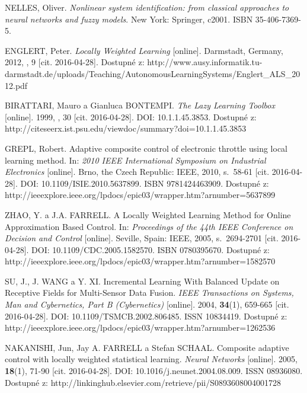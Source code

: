 \begin{thebibliography}{14}
	
	NELLES, Oliver. \textit{Nonlinear system identification: from classical approaches to neural networks and fuzzy models}. New York: Springer, c2001. ISBN 35-406-7369-5.
	
	ENGLERT, Peter. \textit{Locally Weighted Learning} [online]. Darmstadt, Germany, 2012, , 9 [cit. 2016-04-28]. Dostupné z: http://www.ausy.informatik.tu-darmstadt.de/uploads/Teaching/AutonomousLearningSystems/Englert\_ALS\_2012.pdf
	
	BIRATTARI, Mauro a Gianluca BONTEMPI. \textit{The Lazy Learning Toolbox} [online]. 1999, , 30 [cit. 2016-04-28]. DOI: 10.1.1.45.3853. Dostupné z: http://citeseerx.ist.psu.edu/viewdoc/summary?doi=10.1.1.45.3853
	
	GREPL, Robert. Adaptive composite control of electronic throttle using local learning method. In: \textit{2010 IEEE International Symposium on Industrial Electronics} [online]. Brno, the Czech Republic: IEEE, 2010, s.~58-61 [cit. 2016-04-28]. DOI: 10.1109/ISIE.2010.5637899. ISBN 9781424463909. Dostupné z: http://ieeexplore.ieee.org/lpdocs/epic03/wrapper.htm?arnumber=5637899
	
	ZHAO, Y. a J.A. FARRELL. A Locally Weighted Learning Method for Online Approximation Based Control. In: \textit{Proceedings of the 44th IEEE Conference on Decision and Control} [online]. Seville, Spain: IEEE, 2005, s.~2694-2701 [cit. 2016-04-28]. DOI: 10.1109/CDC.2005.1582570. ISBN 0780395670. Dostupné z: http://ieeexplore.ieee.org/lpdocs/epic03/wrapper.htm?arnumber=1582570
	
	SU, J., J. WANG a Y. XI. Incremental Learning With Balanced Update on Receptive Fields for Multi-Sensor Data Fusion. \textit{IEEE Transactions on Systems, Man and Cybernetics, Part B (Cybernetics)} [online]. 2004, \textbf{34}(1), 659-665 [cit. 2016-04-28]. DOI: 10.1109/TSMCB.2002.806485. ISSN 10834419. Dostupné z: http://ieeexplore.ieee.org/lpdocs/epic03/wrapper.htm?arnumber=1262536
	
	NAKANISHI, Jun, Jay A. FARRELL a Stefan SCHAAL. Composite adaptive control with locally weighted statistical learning. \textit{Neural Networks} [online]. 2005, \textbf{18}(1), 71-90 [cit. 2016-04-28]. DOI: 10.1016/j.neunet.2004.08.009. ISSN 08936080. Dostupné z: http://linkinghub.elsevier.com/retrieve/pii/S0893608004001728
	

\end{thebibliography}

